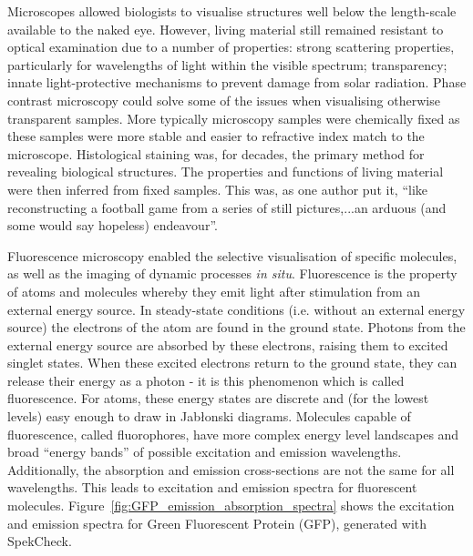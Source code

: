 Microscopes allowed biologists to visualise structures well below the 
length-scale available to the naked eye. However, living material still 
remained resistant to optical examination due to a number of properties: 
strong scattering properties, particularly for wavelengths of light 
within the visible spectrum; transparency; innate light-protective 
mechanisms to prevent damage from solar radiation. Phase contrast 
microscopy could solve some of the issues when visualising otherwise 
transparent samples\cite{burch1942phase}. More typically microscopy 
samples were chemically fixed as these samples were more stable and 
easier to refractive index match to the microscope. Histological staining 
was, for decades, the primary method for revealing biological structures\cite{alturkistani2016histological}. The properties and functions 
of living material were then inferred from fixed samples. This was, as one 
author put it, ``like reconstructing a football game from a series of still 
pictures,...an arduous (and some would say hopeless) 
endeavour''\cite{yuste2005fluorescence}. 

Fluorescence microscopy enabled the selective visualisation of specific 
molecules, as well as the imaging of dynamic processes \textit{in situ}. 
Fluorescence is the property of atoms and molecules whereby they emit light
after stimulation from an external energy source. In steady-state conditions 
(i.e. without an external energy source) the electrons of the atom  
are found in the ground state. Photons from the external energy  
source are absorbed by these electrons, raising them to excited singlet 
states. When these excited electrons return to the ground state, they can 
release their energy as a photon - it is this phenomenon which is called 
fluorescence\cite{ghiran2011introduction}. For atoms, these energy states are
discrete and (for the lowest levels) easy enough to draw in 
Jab\l{}onski diagrams. Molecules capable of fluorescence, called 
fluorophores, have more complex energy level landscapes and broad ``energy 
bands'' of possible excitation and emission 
wavelengths. Additionally, the absorption and emission cross-sections are not 
the same for all wavelengths. This leads to excitation and emission spectra 
for fluorescent molecules. Figure~\ref{fig:GFP_emission_absorption_spectra} 
shows the excitation and emission spectra for Green Fluorescent Protein 
(GFP), generated with SpekCheck\cite{phillips2018spekcheck}.

